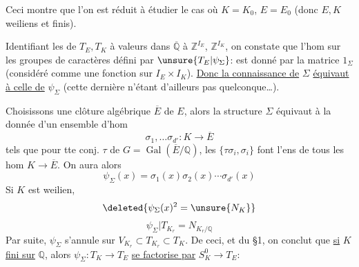Ceci montre que l'on est réduit à étudier  le cas où
$K=K_0$, $E=E_0$ (donc $E,K$ weiliens et finis).

Identifiant les  de $T_E,T_K$ à valeurs dans $\overline{\mathbb Q}$ à
$\mathbb Z^{I_E}$, $\mathbb Z^{I_K}$, on constate que l'hom
 sur les  groupes de caractères
défini par $\unsure{T_E|\psi_\Sigma}$:
est donné par la matrice $1_\Sigma$ (considéré comme une fonction
 sur $I_E\times I_K$).
\uline{Donc la connaissance de} $\Sigma$ \uline{équivaut à celle de} $\psi_\Sigma$
(cette dernière n'étant d'ailleurs pas quelconque\ldots).

Choisissons une clôture algébrique $\overline E$ de $E$,
 
alors la structure $\Sigma$ équivaut à la donnée d'un ensemble  d'hom
\[
\sigma_1,\ldots\sigma_{d'}:K\longrightarrow\overline E
\]
 tels que pour tte conj. $\tau$ de $G=\operatorname{Gal}(\overline E/\mathbb Q)$,
les $\{\tau\sigma_i,\sigma_i\}$ font l'ens de tous les hom $K\longrightarrow\overline E$.
On aura alors
\[
\psi_\Sigma(x)=\sigma_1(x)\sigma_2(x)\cdots\sigma_{d'}(x)
\]
Si $K$ est weilien,
\[
\deleted{\psi_\Sigma(x)^2=\unsure{N_K}}
\]
\[
\psi_\Sigma|T_{K_r}=N_{K_r/\mathbb Q}
\]
Par suite, $\psi_\Sigma$ s'annule sur $V_{K_r}\subset T_{K_r}\subset T_K$.
De ceci, et du §1, on conclut que \uline{si} $K$ \uline{fini sur} $\mathbb Q$,
alors $\psi_\Sigma:T_K\longrightarrow T_E$ \uline{se factorise par} $S_K^0\longrightarrow T_E$:
